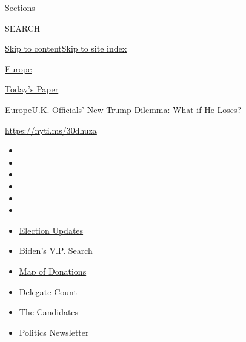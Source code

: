 Sections

SEARCH

\protect\hyperlink{site-content}{Skip to
content}\protect\hyperlink{site-index}{Skip to site index}

\href{https://www.nytimes3xbfgragh.onion/section/world/europe}{Europe}

\href{https://myaccount.nytimes3xbfgragh.onion/auth/login?response_type=cookie\&client_id=vi}{}

\href{https://www.nytimes3xbfgragh.onion/section/todayspaper}{Today's
Paper}

\href{/section/world/europe}{Europe}\textbar{}U.K. Officials' New Trump
Dilemma: What if He Loses?

\url{https://nyti.ms/30dhuza}

\begin{itemize}
\item
\item
\item
\item
\item
\item
\end{itemize}

\begin{itemize}
\item
  \href{https://www.nytimes3xbfgragh.onion/2020/07/31/us/elections/biden-vs-trump.html?action=click\&pgtype=Article\&state=default\&region=TOP_BANNER\&context=storylines_menu}{Election
  Updates}
\item
  \href{https://www.nytimes3xbfgragh.onion/article/biden-vice-president-2020.html?action=click\&pgtype=Article\&state=default\&region=TOP_BANNER\&context=storylines_menu}{Biden's
  V.P. Search}
\item
  \href{https://www.nytimes3xbfgragh.onion/interactive/2020/07/24/us/politics/trump-biden-campaign-donors.html?action=click\&pgtype=Article\&state=default\&region=TOP_BANNER\&context=storylines_menu}{Map
  of Donations}
\item
  \href{https://www.nytimes3xbfgragh.onion/interactive/2020/us/elections/delegate-count-primary-results.html?action=click\&pgtype=Article\&state=default\&region=TOP_BANNER\&context=storylines_menu}{Delegate
  Count}
\item
  \href{https://www.nytimes3xbfgragh.onion/interactive/2019/us/politics/2020-presidential-candidates.html?action=click\&pgtype=Article\&state=default\&region=TOP_BANNER\&context=storylines_menu}{The
  Candidates}
\item
  \href{https://www.nytimes3xbfgragh.onion/newsletters/politics?action=click\&pgtype=Article\&state=default\&region=TOP_BANNER\&context=storylines_menu}{Politics
  Newsletter}
\end{itemize}

